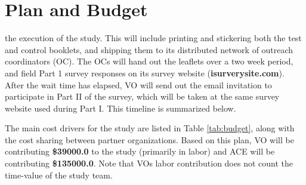 \documentclass{tufte-handout}
\newcommand{\les}[0]{\textsc{LES}}%
\newcommand{\totalrequest}[0]{\textsc{135000.0}}
\newcommand{\totalvo}[0]{\textsc{39000.0}}
\begin{document}
\section{Plan and Budget}

 the execution of the study. This will
include printing and stickering both the test and control booklets,
and shipping them to its distributed network of outreach coordinators (OC).
The OCs will hand out the leaflets over a two week period, and field
Part 1 survey responses on its survey website (\textbf{isurverysite.com}).
After the wait time has elapsed, VO will send out the email invitation
to participate in Part II of the survey, which will be taken at the same
survey website used during Part I. This timeline is summarized below.


The main cost drivers for the study are listed in Table \ref{tab:budget}, along
with the cost sharing between partner organizations. Based on this plan,
VO will be contributing \textbf{\$\totalvo} to the study (primarily in labor) 
and ACE will be contributing \textbf{\$\totalrequest}. Note that VOs labor contribution
does not count the time-value of the study team.
\end{document}
